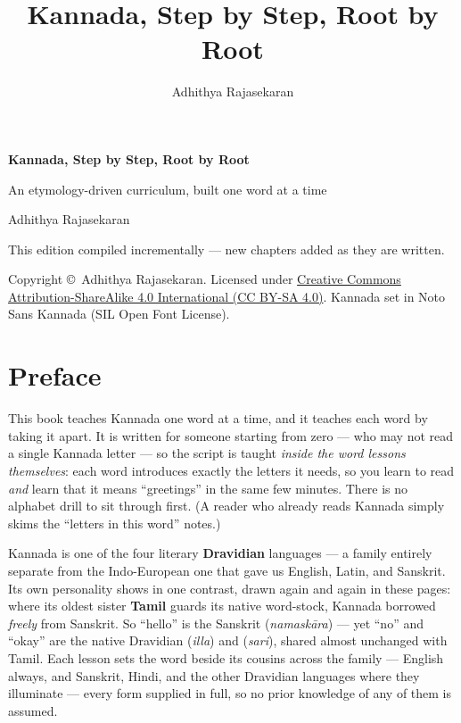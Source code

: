 \documentclass[11pt,twoside]{book}
\title{\Huge Kannada, Step by Step, Root by Root}
\author{Adhithya Rajasekaran}
\date{}
\begin{document}
\frontmatter

\begin{titlepage}
  \centering
  \vspace*{3cm}
  {\Huge\bfseries Kannada, Step by Step, Root by Root\par}
  \vspace{1cm}
  {\Large An etymology-driven curriculum, built one word at a time\par}
  \vspace{1.5cm}
  {\large Adhithya Rajasekaran\par}
  \vfill
  {\large This edition compiled incrementally --- new chapters added as they
  are written.\par}
  \vspace{2cm}
  {\normalsize
    Copyright \copyright\ Adhithya Rajasekaran. Licensed under
    \href{https://creativecommons.org/licenses/by-sa/4.0/}%
    {Creative Commons Attribution-ShareAlike 4.0 International (CC BY-SA 4.0)}.
    Kannada set in Noto Sans Kannada (SIL Open Font License).\par
  }
\end{titlepage}

\chapter*{Preface}

This book teaches Kannada one word at a time, and it teaches each word by taking
it apart. It is written for someone starting from zero --- who may not read a
single Kannada letter --- so the script is taught \emph{inside the word lessons
themselves}: each word
introduces exactly the letters it needs, so you learn to read 
\emph{and} learn that it means ``greetings'' in the same few minutes. There is
no alphabet drill to sit through first. (A reader who already reads Kannada
simply skims the ``letters in this word'' notes.)

Kannada is one of the four literary \textbf{Dravidian} languages --- a family
entirely separate from the Indo-European one that gave us English, Latin, and
Sanskrit. Its own personality shows in one contrast, drawn again and again in
these pages: where its oldest sister \textbf{Tamil} guards its native
word-stock, Kannada borrowed \emph{freely} from Sanskrit. So ``hello'' is the
Sanskrit  (\emph{namaskāra}) --- yet ``no'' and ``okay'' are the
native Dravidian  (\emph{illa}) and  (\emph{sari}), shared
almost unchanged with Tamil. Each lesson sets the word beside its cousins
across the family --- English always, and Sanskrit, Hindi, and the other
Dravidian languages where they illuminate --- every form supplied in full, so
no prior knowledge of any of them is assumed.
\end{document}
